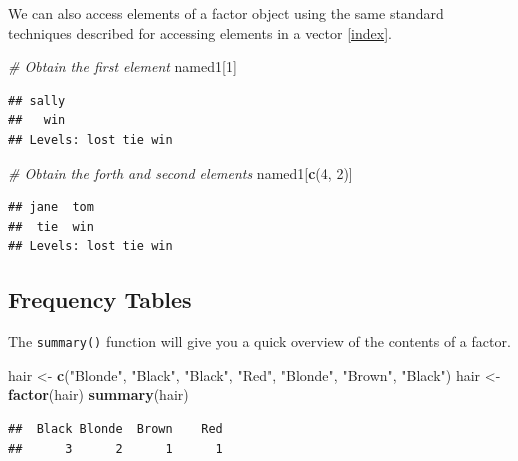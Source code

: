 \documentclass[
]{book}
\newenvironment{Shaded}{\begin{snugshade}}{\end{snugshade}}
\newcommand{\CommentTok}[1]{\textcolor[rgb]{0.56,0.35,0.01}{\textit{#1}}}
\newcommand{\DecValTok}[1]{\textcolor[rgb]{0.00,0.00,0.81}{#1}}
\newcommand{\KeywordTok}[1]{\textcolor[rgb]{0.13,0.29,0.53}{\textbf{#1}}}
\newcommand{\NormalTok}[1]{#1}
\newcommand{\StringTok}[1]{\textcolor[rgb]{0.31,0.60,0.02}{#1}}
\begin{document}
We can also access elements of a factor object using the same standard techniques described for accessing elements in a vector \ref{index}.

\begin{Shaded}
\begin{Highlighting}[]
\CommentTok{# Obtain the first element}
\NormalTok{named1[}\DecValTok{1}\NormalTok{]}
\end{Highlighting}
\end{Shaded}

\begin{verbatim}
## sally 
##   win 
## Levels: lost tie win
\end{verbatim}

\begin{Shaded}
\begin{Highlighting}[]
\CommentTok{# Obtain the forth and second elements}
\NormalTok{named1[}\KeywordTok{c}\NormalTok{(}\DecValTok{4}\NormalTok{, }\DecValTok{2}\NormalTok{)]}
\end{Highlighting}
\end{Shaded}

\begin{verbatim}
## jane  tom 
##  tie  win 
## Levels: lost tie win
\end{verbatim}

\hypertarget{frequency-tables}{%
\subsection{Frequency Tables}\label{frequency-tables}}

The \texttt{summary()} function will give you a quick overview of the contents of a factor.

\begin{Shaded}
\begin{Highlighting}[]
\NormalTok{hair <-}\StringTok{ }\KeywordTok{c}\NormalTok{(}\StringTok{"Blonde"}\NormalTok{, }\StringTok{"Black"}\NormalTok{, }\StringTok{"Black"}\NormalTok{, }\StringTok{"Red"}\NormalTok{, }\StringTok{"Blonde"}\NormalTok{, }\StringTok{"Brown"}\NormalTok{,}
    \StringTok{"Black"}\NormalTok{)}
\NormalTok{hair <-}\StringTok{ }\KeywordTok{factor}\NormalTok{(hair)}
\KeywordTok{summary}\NormalTok{(hair)}
\end{Highlighting}
\end{Shaded}

\begin{verbatim}
##  Black Blonde  Brown    Red 
##      3      2      1      1
\end{verbatim}
\end{document}
